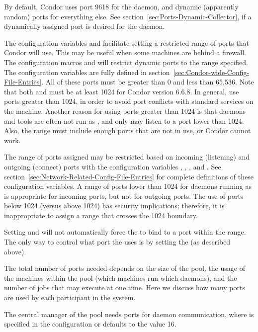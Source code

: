 By default,
Condor uses port 9618 for the  daemon,
and dynamic (apparently random) ports for everything else.
See section~\ref{sec:Ports-Dynamic-Collector},
if a dynamically assigned port is desired for the
 daemon.

The configuration variables
 and  facilitate setting a restricted
range of ports that Condor will use.
This may be useful when some machines are behind a firewall.
The configuration macros
 and  
will restrict dynamic ports to the range specified.
The configuration variables are fully defined
in section~\ref{sec:Condor-wide-Config-File-Entries}.
All of these ports must be greater than 0 and less than 65,536.
Note that both  and  must be at 
least 1024 for Condor version 6.6.8.
In general, use ports greater than 1024,
in order
to avoid port conflicts with standard services on the machine.
Another reason for using ports greater than 1024 is that
daemons and tools are often not run as ,
and only  may listen to a port lower than 1024.
Also, the range must include enough ports that are not in use, 
or Condor cannot work.

The range of ports assigned may be restricted based on 
incoming (listening) and outgoing (connect) ports
with the configuration variables
,
,
, and
.
See section~\ref{sec:Network-Related-Config-File-Entries}
for complete definitions of these configuration variables.
A range of ports lower than 1024 for daemons
running as  is appropriate for incoming ports,
but not for outgoing ports.
The use of ports below 1024 (versus above 1024)
has security implications; 
therefore, it is inappropriate to assign a range that crosses
the 1024 boundary.


\Note Setting  and  will not
automatically force the  to bind to a port within
the range.
The only way to control what port the  uses is by
setting the  (as described above).

The total number of ports needed depends on the size of the pool,
the usage of the machines within the pool (which machines
run which daemons),
and the number of jobs that may execute at one time.
Here we discuss how many ports are used by each
participant in the system.

The central manager of the pool needs
ports for daemon communication,
where 
is specified in the
configuration or defaults to the value 16.

